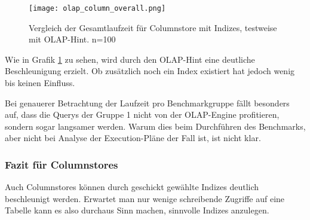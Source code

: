 \begin{figure}[H]
    \centering
    \texttt{[image: olap\_column\_overall.png]}
    \caption{Vergleich der Gesamtlaufzeit für Columnstore mit Indizes, testweise mit OLAP-Hint. n=100}
	\label{fig:olap_column_overall}
\end{figure}

Wie in Grafik \ref{fig:olap_column_overall} zu sehen, wird durch den OLAP-Hint eine deutliche Beschleunigung erzielt. Ob zusätzlich noch ein Index existiert hat jedoch wenig bis keinen Einfluss.

Bei genauerer Betrachtung der Laufzeit pro Benchmarkgruppe fällt besonders auf, dass die Querys der Gruppe 1 nicht von der OLAP-Engine profitieren, sondern sogar langsamer werden. 
Warum dies beim Durchführen des Benchmarks, aber nicht bei Analyse der Execution-Pläne der Fall ist, ist nicht klar.
\fi

\subsubsection{Fazit für Columnstores}
Auch Columnstores können durch geschickt gewählte Indizes deutlich beschleunigt werden. Erwartet man nur wenige schreibende Zugriffe auf eine Tabelle kann es also durchaus Sinn machen, sinnvolle Indizes anzulegen.

